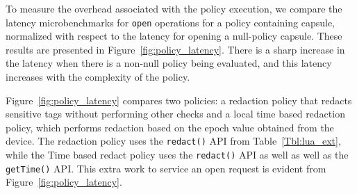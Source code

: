 To measure the overhead associated with the policy execution, we
compare the latency microbenchmarks for \texttt{open} operations for a
policy containing capsule, normalized with respect to the latency for
opening a null-policy capsule. These results are presented in
Figure~\ref{fig:policy_latency}. There is a sharp increase in the
latency when there is a non-null policy being evaluated, and this
latency increases with the complexity of the policy.

Figure~\ref{fig:policy_latency} compares two policies: a redaction
policy that redacts sensitive tags without performing other checks and
a local time based redaction policy, which performs redaction based on
the epoch value obtained from the device. The redaction policy uses
the \texttt{redact()} API from Table~\ref{Tbl:lua_ext}, while the Time
based redact policy uses the \texttt{redact()} API as well as well as
the \texttt{getTime()} API. This extra work to service an open request
is evident from Figure~\ref{fig:policy_latency}.




